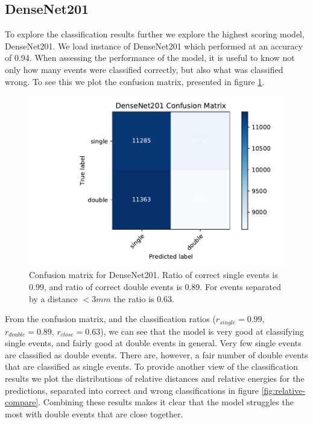 \documentclass[12pt, notitlepage]{article}
\begin{document}
\subsection{DenseNet201}
To explore the classification results further we explore the highest scoring model, DenseNet201.
We load instance of DenseNet201 which performed at an accuracy of 0.94. When assessing the
performance of the model, it is useful to know not only how many events were classified correctly,
but also what was classified wrong. To see this we plot the confusion matrix, presented in figure
\ref{fig:DN201-confusion-matrix}.
\begin{figure}
    \includegraphics[width=\textwidth]{figures/DenseNet201_confmat}
    \caption{Confusion matrix for DenseNet201. Ratio of correct single events is 0.99, and ratio
    of correct double events is 0.89. For events separated by a distance $< 3mm$ the ratio is 0.63.}
    \label{fig:DN201-confusion-matrix}
\end{figure}
From the confusion matrix, and the classification ratios ($r_{single}=0.99$, $r_{double}=0.89$, $r_{close}=0.63$),
we can see that the model is very good at classifying single events, and fairly good at double events in general.
Very few single events are classified as double events. There are, however, a fair number of double events that
are classified as single events. To provide another view of the classification results we plot the distributions
of relative distances and relative energies for the predictions, separated into correct and wrong classifications
in figure \ref{fig:relative-compare}. Combining these results makes it clear that the model struggles the most with double
events that are close together.
\end{document}

